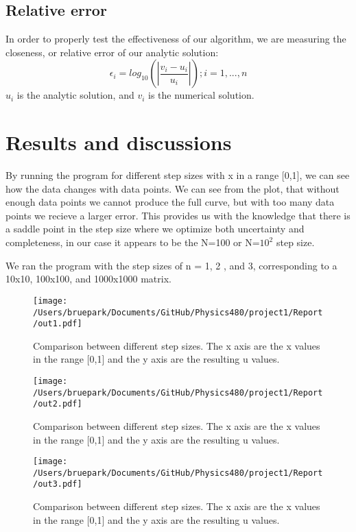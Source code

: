 \documentclass[10pt,showpacs,preprintnumbers,footinbib,amsmath,amssymb,aps,prl,twocolumn,groupedaddress,superscriptaddress,showkeys]{revtex4-1}
\begin{document}
	\subsection{Relative error}
In order to properly test the effectiveness of our algorithm, we are measuring the closeness, or relative error of our analytic solution:
	\begin{equation}
	\epsilon_{i} = log_{10}(|\frac{v_{i}-u_{i}}{u_{i}}|)  ; i = 1,...,n
	\label{error}
	\end{equation}
$u_{i}$ is the analytic solution, and $v_{i}$ is the numerical solution.

\section{Results and discussions}

  By running the program for different step sizes with x in a range [0,1], we can see how the data changes with data points.    We can see from the plot, that without enough data points we cannot produce the full curve, but with too many data points we recieve a larger error.  This provides us with the knowledge that there is a saddle point in the step size where we optimize both uncertainty and completeness, in our case it appears to be the N=100 or N=$10^{2}$ step size.

We ran the program with the step sizes of n = 1, 2 , and 3, corresponding to a 10x10, 100x100, and 1000x1000 matrix. 
 
\begin{figure}[!ht]
	\centering
	\texttt{[image: /Users/bruepark/Documents/GitHub/Physics480/project1/Report/out1.pdf]}
	\label{uvx}
	\caption{Comparison between different step sizes.  The x axis are the x values in the range [0,1] and the y axis are the resulting u values.}
\end{figure}

\begin{figure}[!ht]
	\centering
	\texttt{[image: /Users/bruepark/Documents/GitHub/Physics480/project1/Report/out2.pdf]}
	\label{uvx}
	\caption{Comparison between different step sizes.  The x axis are the x values in the range [0,1] and the y axis are the resulting u values.}
\end{figure}

\begin{figure}[!ht]
	\centering
	\texttt{[image: /Users/bruepark/Documents/GitHub/Physics480/project1/Report/out3.pdf]}
	\label{uvx}
	\caption{Comparison between different step sizes.  The x axis are the x values in the range [0,1] and the y axis are the resulting u values.}
\end{figure}
\end{document}
